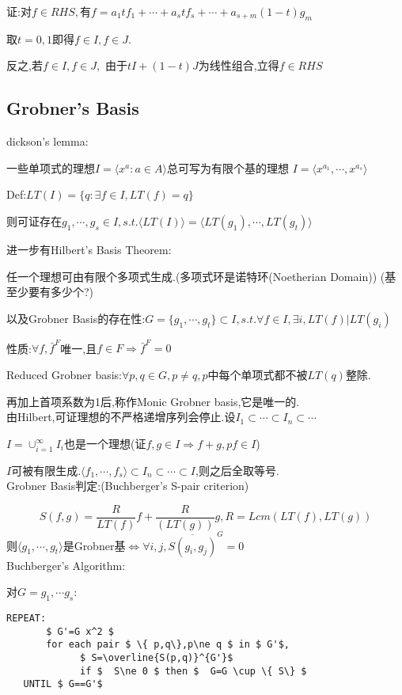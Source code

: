 证:对$ f\in RHS,$有$ f=a_1tf_1+\cdots+a_stf_s+\cdots+a_{s+m}(1-t)g_m$

取$ t=0,1$即得$ f\in I,f\in J$.

反之,若$ f\in I,f\in J,$ 由于$ tI+(1-t)J$为线性组合,立得$ f\in RHS$

\subsection{Grobner's Basis}
dickson's lemma:

一些单项式的理想$ I= \langle x^a : a\in A \rangle $总可写为有限个基的理想
$ I= \langle x^{a_1},\cdots,x^{a_s} \rangle $

Def:$ LT(I)=\{q: \exists f \in I,LT(f)=q\}$

则可证存在$ g_1,\cdots,g_s\in I,s.t.  \langle LT(I) \rangle = \langle LT(g_1),\cdots,LT(g_t) \rangle $

进一步有Hilbert's Basis Theorem:

任一个理想可由有限个多项式生成.(多项式环是诺特环(Noetherian Domain))   (基至少要有多少个?)

以及Grobner Basis的存在性:$ G=\{g_1,\cdots,g_t\}\subset I,s.t.\forall f\in I,\exists i, LT(f)|LT(g_i)$

性质:$ \forall f,\bar{f}^F$唯一,且$ f\in F\Rightarrow \bar{f}^F=0$

Reduced Grobner basis:$ \forall p,q\in G,p\ne q,p$中每个单项式都不被$ LT(q)$整除.

再加上首项系数为1后,称作Monic Grobner basis,它是唯一的.
\\

由Hilbert,可证理想的不严格递增序列会停止.设$ I_1\subset\cdots\subset I_n\subset\cdots$

$ I=\cup_{i=1}^{\infty}I_i$也是一个理想(证$ f,g\in I \Rightarrow f+g,pf\in I$)

$ I$可被有限生成.$  \langle f_1,\cdots,f_s \rangle \subset I_n\subset\cdots \subset I$,则之后全取等号.
\\

Grobner Basis判定:(Buchberger's S-pair criterion)

\[  S(f,g)=\frac{R}{LT(f)}f+\frac{R}{(LT(g))}g,R=Lcm(LT(f),LT(g))\]
则$  \langle g_1,\cdots,g_t \rangle $是Grobner基$ \Leftrightarrow \forall i,j,\overline{S(g_i,g_j)}^G=0$
\\

Buchberger's Algorithm:

对$ G={g_1,\cdots g_s}$:

\begin{lstlisting}[mathescape]
   REPEAT:
       $ G'=G x^2 $
       for each pair $ \{ p,q\},p\ne q $ in $ G'$,
             $ S=\overline{S(p,q)}^{G'}$
             if $  S\ne 0 $ then $  G=G \cup \{ S\} $
   UNTIL $ G==G'$
\end{lstlisting}


